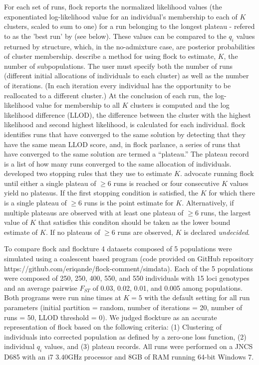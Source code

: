 For each set of runs, {\sc flock} reports the 
normalized likelihood values (the exponentiated log-likelihood value for an individual's 
membership to each of $K$ clusters, scaled to sum to one) for a run belonging to the 
longest plateau - refered to as the 'best run' by \citep{Duc&Tur2012} (see below).
These values can be compared to the $q_i$ values
returned by {\sc structure}, which, in the no-admixture case, are posterior 
probabilities of cluster membership. \citet{Duc&Tur2012} describe a method 
for using {\sc flock} to estimate, $K$, the number of
subpopulations. The user must specify both the number of runs 
(different initial allocations of individuals 
to each cluster) as well as the number of iterations. (In each iteration every individual 
has the opportunity to be reallocated 
to a different cluster.) At the conclusion of each run, the log-likelihood value for 
membership to all $K$ clusters is computed
and the log likelihood difference (LLOD), the difference between the 
cluster with the highest likelihood 
and second highest likelihood, is calculated for each individual. {\sc flock} 
identifies runs that have converged to the same solution by detecting 
that they have the same mean LLOD score, and, in 
{\sc flock} parlance, a series of runs that have converged to the same 
solution are termed a ``plateau.'' The plateau record is a list of 
how many runs converged to the same allocation
of individuals. \citet{Duc&Tur2012} developed two stopping 
rules that they use to estimate $K$. \citet{Duc&Tur2012} advocate 
running  {\sc flock} until either a single plateau of
$\geq 6$ runs is reached or four consecutive $K$ values yield no 
plateaus. If the first stopping condition is satisfied, the $K$ for which 
there is a single plateau of $\geq 6$ runs is the point estimate for $K$. 
Alternatively, if multiple plateaus are observed with at least one plateau 
of $\geq 6$ runs, the largest value of $K$ that satisfies 
this conditon should be taken as the lower bound estimate of $K$. 
If no plateaus of $\geq 6$ runs are observed, $K$
is declared {\em undecided}.

To compare {\sc flock} and {\sc flockture} 4 datasets composed of 5 populations
were simulated using a coalescent based program (code provided on GitHub repository 
https://github.com/eriqande/flock-comment/simdata). Each of the 5 populations
were composed of 250, 250, 400, 550, and 550 individuals with 15 loci genotypes
and an average pairwise $F_{ST}$ of 0.03, 0.02, 0.01, and 0.005 among
populations. Both programs were run nine times at $K=5$ with the default setting for all 
run parameters (initial partition = random, number of iterations = 20, number of runs = 50, 
LLOD threshold = 0). We judged {\sc flockture} as an accurate 
representation of {\sc flock} based on the
following criteria: (1) Clustering of individuals into corrected population as
 defined by a zero-one loss function, (2) individual $q_i$ values, and (3) plateau records. 
All runs were performed on a JNCS D685 with an i7 3.40GHz processor and 8GB of 
RAM running 64-bit Windows 7. 

